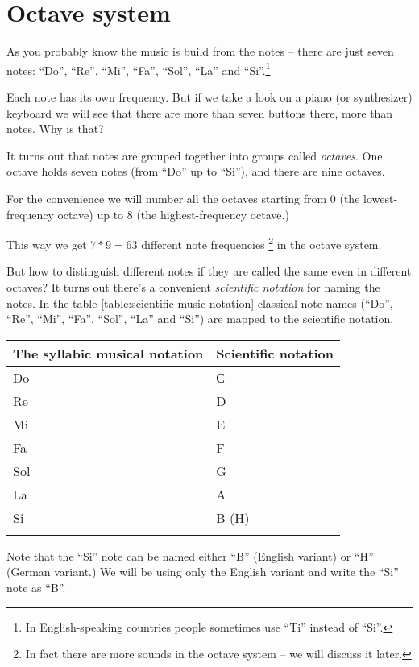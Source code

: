 \documentclass[../sparc.tex]{subfiles}
\begin{document}
\section{Octave system}

As you probably know the music is build from the notes -- there are just seven
notes: ``Do'', ``Re'', ``Mi'', ``Fa'', ``Sol'', ``La'' and ``Si''.\footnote{In
English-speaking countries people sometimes use ``Ti'' instead of
``Si''.\cite{happynote}}

Each note has its own frequency.  But if we take a look on a piano (or
synthesizer) keyboard we will see that there are more than seven buttons there,
more than notes.  Why is that?

It turns out that notes are grouped together into groups called \emph{octaves}.
One octave holds seven notes (from ``Do'' up to ``Si''), and there are nine
octaves.

For the convenience we will number all the octaves starting from 0 (the
lowest-frequency octave) up to 8 (the highest-frequency octave.)

This way we get $7 * 9 = 63$ different note frequencies \footnote{In fact there
are more sounds in the octave system -- we will discuss it later.} in the octave
system.

But how to distinguish different notes if they are called the same even in
different octaves?  It turns out there's a convenient \emph{scientific notation}
for naming the notes.  In the table \ref{table:scientific-music-notation}
classical note names (``Do'', ``Re'', ``Mi'', ``Fa'', ``Sol'', ``La'' and
``Si'') are mapped to the scientific notation.

\begin{tabular}{p{4cm}|p{4cm}}
  The syllabic musical notation & Scientific notation \\
  \hline \hline
  Do   & С \\
  \hline
  Re   & D \\
  \hline
  Mi   & E \\
  \hline
  Fa   & F \\
  \hline
  Sol & G \\
  \hline
  La   & A \\
  \hline
  Si   & B (H) \\
  \hline
  \label{table:scientific-music-notation}
\end{tabular}

Note that the ``Si'' note can be named either ``B'' (English variant) or ``H''
(German variant.)  We will be using only the English variant and write the
``Si'' note as ``B''.
\end{document}
